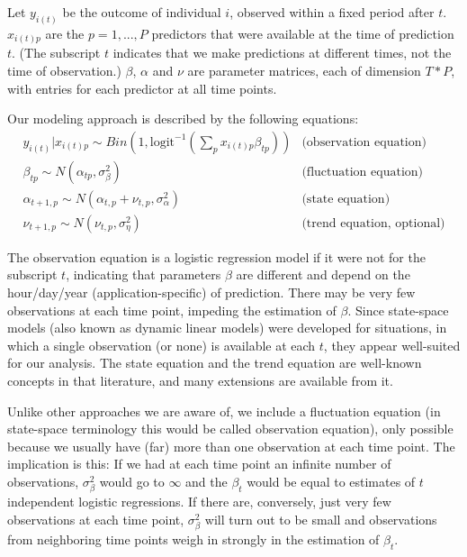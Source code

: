 \documentclass{article}
\begin{document}
Let $y_{i(t)}$ be the outcome of individual $i$, observed within a fixed period after $t$. $x_{i(t)p}$ are the $p = 1, ..., P$ predictors that were available at the time of prediction $t$. (The subscript $t$ indicates that we make predictions at different times, not the time of observation.) $\beta$, $\alpha$ and $\nu$ are parameter matrices, each of dimension $T*P$, with entries for each predictor at all time points.

Our modeling approach is described by the following equations:
\begin{eqnarray}
y_{i(t)} | x_{i(t)p} \sim Bin(1, \textrm{logit}^{-1}(\sum_p x_{i(t)p} \beta_{tp})) & \textrm{(observation equation)} \\
\beta_{tp} \sim N(\alpha_{tp}, \sigma^2_{\beta})\textrm{~~~~~~~~~~~~~~~~~~~~~~~~~~~~~~} & \textrm{(fluctuation equation)} \\
\alpha_{t+1,p} \sim N(\alpha_{t,p} + \nu_{t,p}, \sigma^2_{\alpha})\textrm{~~~~~~~~~~~~~~~~~~} & \textrm{(state equation)} \\
\nu_{t+1,p} \sim N(\nu_{t,p}, \sigma^2_{\eta})\textrm{~~~~~~~~~~~~~~~~~~~~~~~~~~~~~~} & \textrm{(trend equation, optional)}
\end{eqnarray}

The observation equation is a logistic regression model if it were not for the subscript $t$, indicating that parameters $\beta$ are different and depend on the hour/day/year (application-specific) of prediction. There may be very few observations at each time point, impeding the estimation of $\beta$. Since state-space models (also known as dynamic linear models) \citep{prado_time_2010, shumway_time_2011, durbin_time_2012} were developed for situations, in which a single observation (or none) is available at each $t$, they appear well-suited for our analysis. The state equation and the trend equation are well-known concepts in that literature, and many extensions are available from it.

Unlike other approaches we are aware of, we include a fluctuation equation (in state-space terminology this would be called observation equation), only possible because we usually have (far) more than one observation at each time point. The implication is this: If we had at each time point an infinite number of observations, $\sigma^2_\beta$ would go to $\infty$ and the $\beta_t$ would be equal to estimates of $t$ independent logistic regressions. If there are, conversely, just very few observations at each time point, $\sigma^2_\beta$ will turn out to be small and observations from neighboring time points weigh in strongly in the estimation of $\beta_t$.
\end{document}
